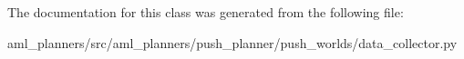 The documentation for this class was generated from the following file\-:\begin{DoxyCompactItemize}
\item 
aml\-\_\-planners/src/aml\-\_\-planners/push\-\_\-planner/push\-\_\-worlds/data\-\_\-collector.\-py\end{DoxyCompactItemize}
